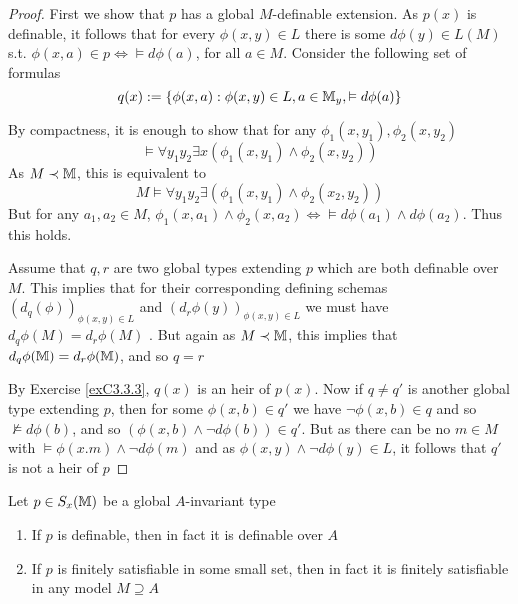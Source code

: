 \documentclass[11pt]{article}
\begin{document}
\begin{proof}
First we show that \(p\) has a global \(M\)-definable extension. As \(p(x)\) is definable, it
follows that for every \(\phi(x,y)\in L\) there is some \(d\phi(y)\in L(M)\) s.t. \(\phi(x,a)\in p\Leftrightarrow\vDash d\phi(a)\),
for all \(a\in M\). Consider the following set of formulas
\begin{equation*}
q(x):=\{\phi(x,a):\phi(x,y)\in L,a\in\mathbb{M}_y,\vDash d\phi(a)\}
\end{equation*}

By compactness, it is enough to show that for any \(\phi_1(x,y_1),\phi_2(x,y_2)\)
\begin{equation*}
\vDash\forall y_1y_2\exists x(\phi_1(x,y_1)\wedge\phi_2(x,y_2))
\end{equation*}
As \(M\prec\mathbb{M}\), this is equivalent to
\begin{equation*}
M\vDash\forall y_1y_2\exists(\phi_1(x,y_1)\wedge\phi_2(x_2,y_2))
\end{equation*}
But for any \(a_1,a_2\in M\), \(\phi_1(x,a_1)\wedge\phi_2(x,a_2)\Leftrightarrow\vDash d\phi(a_1)\wedge d\phi(a_2)\). Thus this holds.

Assume that \(q,r\) are two global types extending \(p\) which are both definable over \(M\).
This implies that for their corresponding defining schemas \((d_q(\phi))_{\phi(x,y)\in L}\)
and \((d_r\phi(y))_{\phi(x,y)\in L}\) we must have \(d_q\phi(M)=d_r\phi(M)\)
. But again as \(M\prec\mathbb{M}\), this implies
that \(d_q\phi(\mathbb{M})=d_r\phi(\mathbb{M})\), and so \(q=r\)

By Exercise \ref{exC3.3.3}, \(q(x)\) is an heir of \(p(x)\). Now if \(q\neq q'\) is another global
type extending \(p\), then for some \(\phi(x,b)\in q'\) we have \(\neg\phi(x,b)\in q\) and
so \(\not\vDash d\phi(b)\), and so \((\phi(x,b)\wedge\neg d\phi(b))\in q'\). But as there can be no \(m\in M\)
with \(\vDash\phi(x.m)\wedge\neg d\phi(m)\) and as \(\phi(x,y)\wedge\neg d\phi(y)\in L\), it follows that \(q'\) is not a heir of \(p\)
\end{proof}

\begin{proposition}[]
Let \(p\in S_x(\mathbb{M})\) be a global \(A\)-invariant type
\begin{enumerate}
\item If \(p\) is definable, then in fact it is definable over \(A\)
\item If \(p\) is finitely satisfiable in some small set, then in fact it is finitely satisfiable
in any model \(M\supseteq A\)
\end{enumerate}
\end{proposition}
\end{document}
